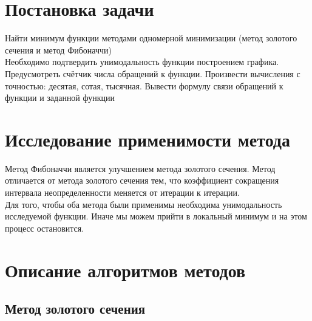 \documentclass[main.tex]{subfiles}
\begin{document}
	
	\section{Постановка задачи}
	Найти минимум функции методами одномерной минимизации (метод золотого сечения и метод Фибоначчи)\\
	Необходимо подтвердить унимодальность функции построением графика.\\
	Предусмотреть счётчик числа обращений к функции.
	Произвести вычисления с точностью: десятая, сотая, тысячная.
	Вывести формулу связи обращений к функции и заданной функции
	\section{Исследование применимости метода}
	Метод Фибоначчи является улучшением метода золотого сечения. Метод отличается от метода золотого сечения тем, что коэффициент сокращения интервала неопределенности меняется от итерации к итерации.\\
	Для того, чтобы оба метода были применимы необходима унимодальность исследуемой функции. Иначе мы можем прийти в локальный минимум и на этом процесс остановится.
	\section{Описание алгоритмов методов}
	
	\subsection{Метод золотого сечения}
	
\end{document}
